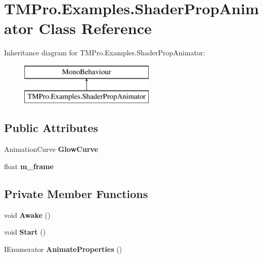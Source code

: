 \hypertarget{class_t_m_pro_1_1_examples_1_1_shader_prop_animator}{}\section{T\+M\+Pro.\+Examples.\+Shader\+Prop\+Animator Class Reference}
\label{class_t_m_pro_1_1_examples_1_1_shader_prop_animator}
Inheritance diagram for T\+M\+Pro.\+Examples.\+Shader\+Prop\+Animator\+:\begin{figure}[H]
\begin{center}
\leavevmode
\includegraphics[height=2.000000cm]{class_t_m_pro_1_1_examples_1_1_shader_prop_animator}
\end{center}
\end{figure}
\subsection*{Public Attributes}
\begin{DoxyCompactItemize}
\item 
\mbox{\label{class_t_m_pro_1_1_examples_1_1_shader_prop_animator_a5b9d48d8e4affbb0d205aa88136919f1}} 
Animation\+Curve {\bfseries Glow\+Curve}
\item 
\mbox{\label{class_t_m_pro_1_1_examples_1_1_shader_prop_animator_a6e28899cd07f82e7b51db5d99d06abc0}} 
float {\bfseries m\+\_\+frame}
\end{DoxyCompactItemize}
\subsection*{Private Member Functions}
\begin{DoxyCompactItemize}
\item 
\mbox{\label{class_t_m_pro_1_1_examples_1_1_shader_prop_animator_a6b90e947cd9b865b817b0e880d1966e8}} 
void {\bfseries Awake} ()
\item 
\mbox{\label{class_t_m_pro_1_1_examples_1_1_shader_prop_animator_a5e02cbaa1836717ecb1d3c7ca1102117}} 
void {\bfseries Start} ()
\item 
\mbox{\label{class_t_m_pro_1_1_examples_1_1_shader_prop_animator_a10d4f51c73fd5a477bd599db3fda4b18}} 
I\+Enumerator {\bfseries Animate\+Properties} ()
\end{DoxyCompactItemize}
